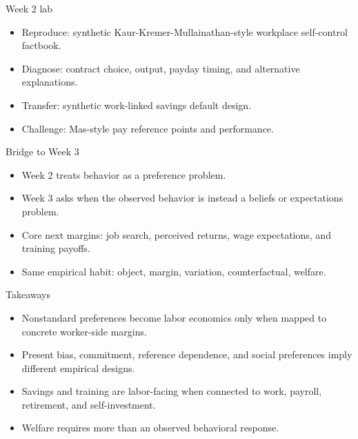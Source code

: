 \documentclass[aspectratio=169,11pt]{beamer}
\begin{document}
\begin{frame}{Week 2 lab}
\begin{itemize}
    \item Reproduce: synthetic Kaur-Kremer-Mullainathan-style workplace self-control factbook.
    \item Diagnose: contract choice, output, payday timing, and alternative explanations.
    \item Transfer: synthetic work-linked savings default design.
    \item Challenge: Mas-style pay reference points and performance.
\end{itemize}
\end{frame}

\begin{frame}{Bridge to Week 3}
\begin{itemize}
    \item Week 2 treats behavior as a preference problem.
    \item Week 3 asks when the observed behavior is instead a beliefs or expectations problem.
    \item Core next margins: job search, perceived returns, wage expectations, and training payoffs.
    \item Same empirical habit: object, margin, variation, counterfactual, welfare.
\end{itemize}
\end{frame}

\begin{frame}{Takeaways}
\begin{itemize}
    \item Nonstandard preferences become labor economics only when mapped to concrete worker-side margins.
    \item Present bias, commitment, reference dependence, and social preferences imply different empirical designs.
    \item Savings and training are labor-facing when connected to work, payroll, retirement, and self-investment.
    \item Welfare requires more than an observed behavioral response.
\end{itemize}
\end{frame}
\end{document}
